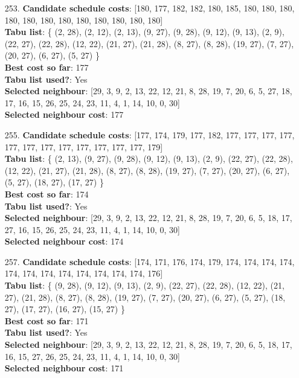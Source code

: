 \documentclass[fleqn]{article}
\begin{document}
\begin{itemize}
    \item[253.] \textbf{Candidate schedule costs}: [180, 177, 182, 182, 180, 185, 180, 180, 180, 180, 180, 180, 180, 180, 180, 180, 180, 180] \\
    \textbf{Tabu list}: \{ (2, 28), (2, 12), (2, 13), (9, 27), (9, 28), (9, 12), (9, 13), (2, 9), (22, 27), (22, 28), (12, 22), (21, 27), (21, 28), (8, 27), (8, 28), (19, 27), (7, 27), (20, 27), (6, 27), (5, 27) \} \\
    \textbf{Best cost so far}: 177 \\
    \textbf{Tabu list used?}: Yes \\
    \textbf{Selected neighbour}: [29, 3, 9, 2, 13, 22, 12, 21, 8, 28, 19, 7, 20, 6, 5, 27, 18, 17, 16, 15, 26, 25, 24, 23, 11, 4, 1, 14, 10, 0, 30] \\
    \textbf{Selected neighbour cost}: 177
      

    \item[255.] \textbf{Candidate schedule costs}: [177, 174, 179, 177, 182, 177, 177, 177, 177, 177, 177, 177, 177, 177, 177, 177, 177, 179] \\
    \textbf{Tabu list}: \{ (2, 13), (9, 27), (9, 28), (9, 12), (9, 13), (2, 9), (22, 27), (22, 28), (12, 22), (21, 27), (21, 28), (8, 27), (8, 28), (19, 27), (7, 27), (20, 27), (6, 27), (5, 27), (18, 27), (17, 27) \} \\
    \textbf{Best cost so far}: 174 \\
    \textbf{Tabu list used?}: Yes \\
    \textbf{Selected neighbour}: [29, 3, 9, 2, 13, 22, 12, 21, 8, 28, 19, 7, 20, 6, 5, 18, 17, 27, 16, 15, 26, 25, 24, 23, 11, 4, 1, 14, 10, 0, 30] \\
    \textbf{Selected neighbour cost}: 174
      

    \item[257.] \textbf{Candidate schedule costs}: [174, 171, 176, 174, 179, 174, 174, 174, 174, 174, 174, 174, 174, 174, 174, 174, 174, 176] \\
    \textbf{Tabu list}: \{ (9, 28), (9, 12), (9, 13), (2, 9), (22, 27), (22, 28), (12, 22), (21, 27), (21, 28), (8, 27), (8, 28), (19, 27), (7, 27), (20, 27), (6, 27), (5, 27), (18, 27), (17, 27), (16, 27), (15, 27) \} \\
    \textbf{Best cost so far}: 171 \\
    \textbf{Tabu list used?}: Yes \\
    \textbf{Selected neighbour}: [29, 3, 9, 2, 13, 22, 12, 21, 8, 28, 19, 7, 20, 6, 5, 18, 17, 16, 15, 27, 26, 25, 24, 23, 11, 4, 1, 14, 10, 0, 30] \\
    \textbf{Selected neighbour cost}: 171
      


\end{itemize}
\end{document}
